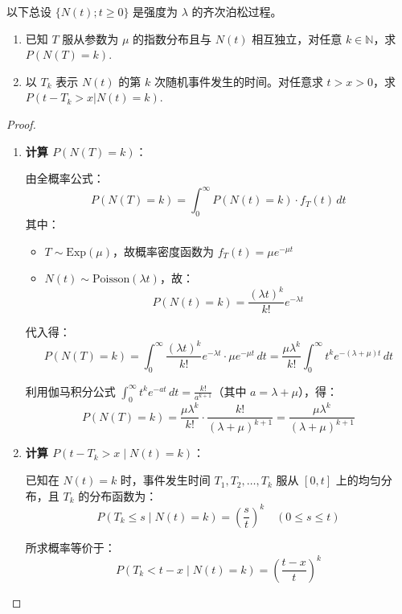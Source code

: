 \documentclass[lang=cn,10pt,thmcnt=section]{elegantbook}
\begin{document}
\begin{example}
	以下总设 $\{N(t); t \geq 0\}$ 是强度为 $\lambda$ 的齐次泊松过程。
\begin{enumerate}
    \item 已知 $T$ 服从参数为 $\mu$ 的指数分布且与 $N(t)$ 相互独立，对任意 $k \in \mathbb{N}$，求 $P(N(T) = k)$.
    \item 以 $T_k$ 表示 $N(t)$ 的第 $k$ 次随机事件发生的时间。对任意求 $t > x > 0$，求 $P(t - T_k > x | N(t) = k)$.
\end{enumerate}
\end{example}
\begin{proof}
	\begin{enumerate}[label=(\arabic*)]
		\item \textbf{计算 $P(N(T) = k)$}：
		
		  由全概率公式：
		  \[
		  P(N(T) = k) = \int_{0}^{\infty} P(N(t) = k) \cdot f_T(t) \, dt
		  \]
		  其中：
		  \begin{itemize}
			\item $T \sim \text{Exp}(\mu)$，故概率密度函数为 $f_T(t) = \mu e^{-\mu t}$
			\item $N(t) \sim \text{Poisson}(\lambda t)$，故：
			  \[
			  P(N(t) = k) = \frac{(\lambda t)^k}{k!} e^{-\lambda t}
			  \]
		  \end{itemize}
		
		  代入得：
		  \[
		  P(N(T) = k) = \int_{0}^{\infty} \frac{(\lambda t)^k}{k!} e^{-\lambda t} \cdot \mu e^{-\mu t} \, dt = \frac{\mu \lambda^k}{k!} \int_{0}^{\infty} t^k e^{-(\lambda + \mu)t} \, dt
		  \]
		
		  利用伽马积分公式 $\int_{0}^{\infty} t^k e^{-a t} \, dt = \frac{k!}{a^{k+1}}$（其中 $a = \lambda + \mu$），得：
		  \[
		  P(N(T) = k) = \frac{\mu \lambda^k}{k!} \cdot \frac{k!}{(\lambda + \mu)^{k+1}} = \frac{\mu \lambda^k}{(\lambda + \mu)^{k+1}}
		  \]
		
  
		  \item \textbf{计算 $P(t - T_k > x \mid N(t) = k)$}：
		  
			已知在 $N(t) = k$ 时，事件发生时间 $T_1, T_2, \dots, T_k$ 服从 $[0, t]$ 上的均匀分布，且 $T_k$ 的分布函数为：
			\[
			P(T_k \leq s \mid N(t) = k) = \left( \frac{s}{t} \right)^k \quad (0 \leq s \leq t)
			\]
		  
			所求概率等价于：
			\[
			P(T_k < t - x \mid N(t) = k) = \left( \frac{t - x}{t} \right)^k
			\]
		  
		
		\end{enumerate}
		
\end{proof}
\end{document}
